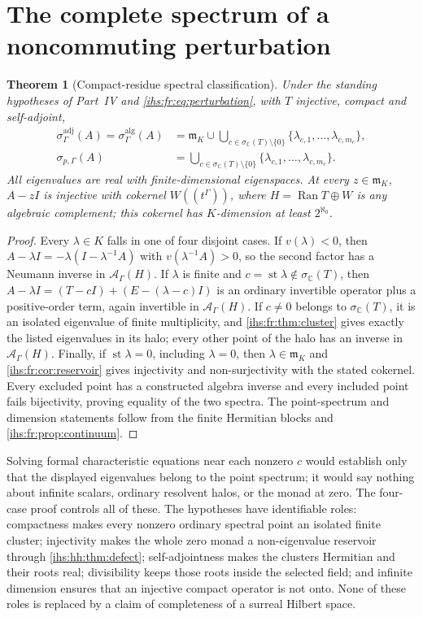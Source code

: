 \documentclass[11pt,a4paper]{article}
\numberwithin{equation}{section}
\newtheorem{theorem}{Theorem}[section]
\theoremstyle{definition}
\theoremstyle{remark}
\newcommand{\C}{\mathbb C}
\newcommand{\K}{K}
\newcommand{\mK}{\mathfrak m_K}
\newcommand{\Ahh}{\mathcal A_\Gamma(H)}
\newcommand{\st}{\operatorname{st}}
\newcommand{\Ran}{\operatorname{Ran}}
\begin{document}
\section{The complete spectrum of a noncommuting perturbation}\label{ihs:fr:sec:main}

\begin{theorem}[Compact-residue spectral classification]\label{ihs:fr:thm:main}
Under the standing hypotheses of Part~IV and \eqref{ihs:fr:eq:perturbation},
with $T$ injective, compact and self-adjoint,
\begin{align}
 \sigma^{\mathrm{adj}}_\Gamma(A)=\sigma^{\mathrm{alg}}_\Gamma(A)
 &=\mK\cup\bigcup_{c\in\sigma_\C(T)\setminus\{0\}}
   \{\lambda_{c,1},\ldots,\lambda_{c,m_c}\},\label{ihs:fr:eq:mainspectrum}\\
 \sigma_{p,\Gamma}(A)
 &=\bigcup_{c\in\sigma_\C(T)\setminus\{0\}}
   \{\lambda_{c,1},\ldots,\lambda_{c,m_c}\}.\label{ihs:fr:eq:mainpoint}
\end{align}
All eigenvalues are real with finite-dimensional eigenspaces. At every
$z\in\mK$, $A-zI$ is injective with cokernel $W((t^\Gamma))$, where
$H=\Ran T\oplus W$ is any algebraic complement; this cokernel has
$\K$-dimension at least $2^{\aleph_0}$.
\end{theorem}
\begin{proof}
Every $\lambda\in\K$ falls in one of four disjoint cases. If
$v(\lambda)<0$, then $A-\lambda I=-\lambda(I-\lambda^{-1}A)$ with
$v(\lambda^{-1}A)>0$, so the second factor has a Neumann inverse in $\Ahh$.
If $\lambda$ is finite and $c=\st\lambda\notin\sigma_\C(T)$, then
$A-\lambda I=(T-cI)+(E-(\lambda-c)I)$ is an ordinary invertible operator plus
a positive-order term, again invertible in $\Ahh$. If $c\ne0$ belongs to
$\sigma_\C(T)$, it is an isolated eigenvalue of finite multiplicity, and
\cref{ihs:fr:thm:cluster} gives exactly the listed eigenvalues in its halo;
every other point of the halo has an inverse in $\Ahh$. Finally, if
$\st\lambda=0$, including $\lambda=0$, then $\lambda\in\mK$ and
\cref{ihs:fr:cor:reservoir} gives injectivity and non-surjectivity with the
stated cokernel. Every excluded point has a constructed algebra inverse and
every included point fails bijectivity, proving equality of the two spectra.
The point-spectrum and dimension statements follow from the finite Hermitian
blocks and \cref{ihs:fr:prop:continuum}.
\end{proof}

Solving formal characteristic equations near each nonzero $c$ would establish
only that the displayed eigenvalues belong to the point spectrum; it would
say nothing about infinite scalars, ordinary resolvent halos, or the monad at
zero. The four-case proof controls all of these. The hypotheses have
identifiable roles: compactness makes every nonzero ordinary spectral point
an isolated finite cluster; injectivity makes the whole zero monad a
non-eigenvalue reservoir through \cref{ihs:hh:thm:defect}; self-adjointness
makes the clusters Hermitian and their roots real; divisibility keeps those
roots inside the selected field; and infinite dimension ensures that an
injective compact operator is not onto. None of these roles is replaced by a
claim of completeness of a surreal Hilbert space.
\end{document}

